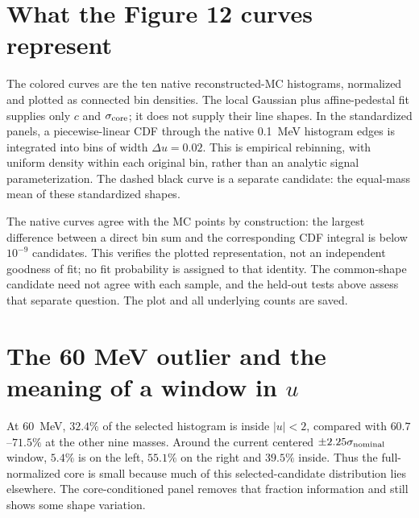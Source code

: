 \clearpage
\section{What the Figure 12 curves represent}\label{sec:MCpoints}
The colored curves are the ten native reconstructed-MC histograms,
normalized and plotted as connected bin densities. The local Gaussian
plus affine-pedestal fit supplies only $c$ and $\sigma_{\rm core}$;
it does not supply their line shapes. In the standardized panels, a
piecewise-linear CDF through the native 0.1~MeV histogram edges is
integrated into bins of width $\Delta u=0.02$. This is empirical
rebinning, with uniform density within each original bin, rather than
an analytic signal parameterization. The dashed black curve is a
separate candidate: the equal-mass mean of these standardized shapes.


The native curves agree with the MC points by construction: the
largest difference between a direct bin sum and the corresponding
CDF integral is below $10^{-9}$ candidates. This verifies the plotted
representation, not an independent goodness of fit; no fit probability
is assigned to that identity. The common-shape candidate need not
agree with each sample, and the held-out tests above assess that
separate question. The plot and all underlying counts are saved.

\clearpage
\section{The 60 MeV outlier and the meaning of a window in $u$}
At 60~MeV, $32.4\%$ of the selected histogram is inside $|u|<2$,
compared with $60.7$--$71.5\%$ at the other nine masses. Around the
current centered $\pm2.25\sigma_{\rm nominal}$ window, $5.4\%$ is
on the left, $55.1\%$ on the right and $39.5\%$ inside. Thus the
full-normalized core is small because much of this selected-candidate
distribution lies elsewhere. The core-conditioned panel removes that
fraction information and still shows some shape variation.

